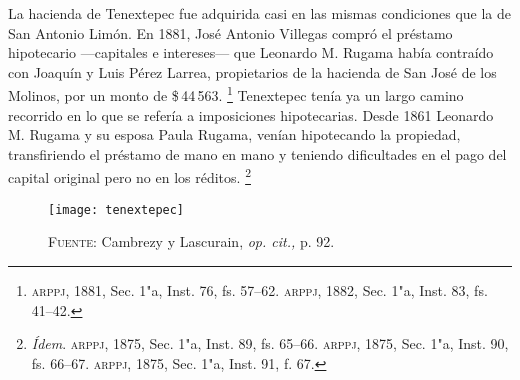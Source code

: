 \documentclass[14pt,twoside,final]{extbook} %
\let\oldfootnote\footnote
\renewcommand\footnote[1]{%
\oldfootnote{\hspace{1mm}#1}}
\begin{document}
La hacienda de Tenextepec fue adquirida casi en las mismas condiciones que la de San Antonio Limón. En 1881, José Antonio Villegas compró el préstamo hipotecario ---capitales e intereses--- que Leonardo M. Rugama había contraído con Joaquín y Luis Pérez Larrea, propietarios de la hacienda de San José de los Molinos, por un monto de \$\,44\,563.\footnote{\textsc{arppj}, 1881, Sec. 1"a, Inst. 76, fs. 57--62. \textsc{arppj}, 1882, Sec. 1"a, Inst. 83, fs. 41--42.} Tenextepec tenía ya un largo camino recorrido en lo que se refería a imposiciones hipotecarias. Desde 1861 Leonardo M. Rugama y su esposa Paula Rugama, venían hipotecando la propiedad, transfiriendo el préstamo de mano en mano y teniendo dificultades en el pago del capital original pero no en los réditos.\footnote{\emph{Ídem}. \textsc{arppj}, 1875, Sec. 1"a, Inst. 89, fs. 65--66. \textsc{arppj}, 1875, Sec. 1"a, Inst. 90, fs. 66--67. \textsc{arppj}, 1875, Sec. 1"a, Inst. 91, f. 67.}
\begin{sidewaysfigure}
\centering
\texttt{[image: tenextepec]}
\caption[Plano de la hacienda de Tenextepec]{\textsc{Fuente:} Cambrezy y Lascurain, \emph{op. cit.,} p. 92.}
\label{fig:hda-tenextepec}
\end{sidewaysfigure}
\end{document}
